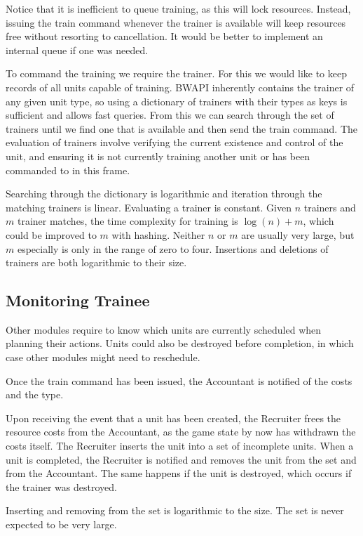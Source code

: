 	Notice that it is inefficient to queue training, as this will lock resources. Instead, issuing the train command whenever the trainer is available will keep resources free without resorting to cancellation. It would be better to implement an internal queue if one was needed.
	
	To command the training we require the trainer. For this we would like to keep records of all units capable of training. BWAPI inherently contains the trainer of any given unit type, so using a dictionary of trainers with their types as keys is sufficient and allows fast queries. From this we can search through the set of trainers until we find one that is available and then send the train command. The evaluation of trainers involve verifying the current existence and control of the unit, and ensuring it is not currently training another unit or has been commanded to in this frame.
	
	Searching through the dictionary is logarithmic and iteration through the matching trainers is linear. Evaluating a trainer is constant. Given $n$ trainers and $m$ trainer matches, the time complexity for training is $\log(n) + m$, which could be improved to $m$ with hashing. Neither $n$ or $m$ are usually very large, but $m$ especially is only in the range of zero to four. Insertions and deletions of trainers are both logarithmic to their size.

	\subsection*{Monitoring Trainee}
	Other modules require to know which units are currently scheduled when planning their actions. Units could also be destroyed before completion, in which case other modules might need to reschedule.
	
	Once the train command has been issued, the Accountant is notified of the costs and the type.
	
	Upon receiving the event that a unit has been created, the Recruiter frees the resource costs from the Accountant, as the game state by now has withdrawn the costs itself. The Recruiter inserts the unit into a set of incomplete units. When a unit is completed, the Recruiter is notified and removes the unit from the set and from the Accountant. The same happens if the unit is destroyed, which occurs if the trainer was destroyed.
	
	Inserting and removing from the set is logarithmic to the size. The set is never expected to be very large.

